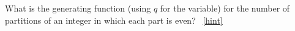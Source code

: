 \documentclass{book}
\begin{document}
\setcounter{project}{321}
\addtocounter{project}{-1}
\begin{activity}[]\label{activity-314}
\hypertarget{p-1647}{}%
What is the generating function (using \(q\) for the variable) for the number of partitions of an integer in which each part is even?%
~\hfill{\tiny\hyperlink{a-321}{[hint]}\hypertarget{q-321}{}}\end{activity}
\end{document}
